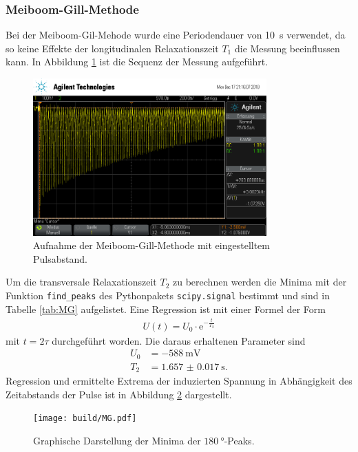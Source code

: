 \subsubsection{Meiboom-Gill-Methode}
Bei der Meiboom-Gil-Mehode wurde eine Periodendauer von \SI{10}{\second}
verwendet, da so keine Effekte der longitudinalen Relaxationszeit $T_1$ die
Messung beeinflussen kann. In Abbildung \ref{fig:MG} ist die Sequenz der Messung
aufgeführt.
\begin{figure}[htb]
  \centering
  \includegraphics[width=0.8\textwidth]{rohdaten/mg_2.png}
  \caption{Aufnahme der Meiboom-Gill-Methode mit eingestelltem Pulsabstand.}
  \label{fig:MG}
\end{figure}

Um die transversale Relaxationszeit $T_2$ zu berechnen werden die Minima mit der
Funktion \texttt{find\_peaks} des Pythonpakets \texttt{scipy.signal} bestimmt und
sind in Tabelle \ref{tab:MG} aufgelistet.
Eine Regression ist mit einer Formel
der Form
\begin{align*}
  U(t) = U_0 \cdot \text{e}^{-\frac{t}{T_2}}
\end{align*}
mit $t = 2\tau$ durchgeführt worden. Die daraus erhaltenen Parameter sind
\begin{align*}
  U_0 &= -\SI{588}{\milli\volt} \\
  T_2 &= \SI{1.657(17)}{\second}.
\end{align*}
Regression und ermittelte Extrema der induzierten Spannung in Abhängigkeit des
Zeitabstands der Pulse ist in Abbildung \ref{plt:MG} dargestellt.
\begin{figure}[htb]
  \centering
  \texttt{[image: build/MG.pdf]}
  \caption{Graphische Darstellung der Minima der $\SI{180}{\degree}$-Peaks.}
  \label{plt:MG}
\end{figure}
\FloatBarrier

